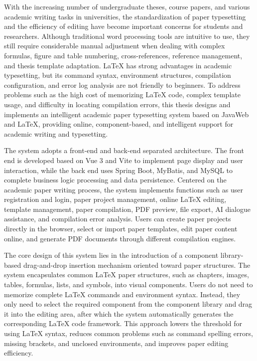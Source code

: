 With the increasing number of undergraduate theses, course papers, and various academic writing tasks in universities, the standardization of paper typesetting and the efficiency of editing have become important concerns for students and researchers. Although traditional word processing tools are intuitive to use, they still require considerable manual adjustment when dealing with complex formulas, figure and table numbering, cross-references, reference management, and thesis template adaptation. LaTeX has strong advantages in academic typesetting, but its command syntax, environment structures, compilation configuration, and error log analysis are not friendly to beginners. To address problems such as the high cost of memorizing LaTeX code, complex template usage, and difficulty in locating compilation errors, this thesis designs and implements an intelligent academic paper typesetting system based on JavaWeb and LaTeX, providing online, component-based, and intelligent support for academic writing and typesetting.

The system adopts a front-end and back-end separated architecture. The front end is developed based on Vue 3 and Vite to implement page display and user interaction, while the back end uses Spring Boot, MyBatis, and MySQL to complete business logic processing and data persistence. Centered on the academic paper writing process, the system implements functions such as user registration and login, paper project management, online LaTeX editing, template management, paper compilation, PDF preview, file export, AI dialogue assistance, and compilation error analysis. Users can create paper projects directly in the browser, select or import paper templates, edit paper content online, and generate PDF documents through different compilation engines.

The core design of this system lies in the introduction of a component library-based drag-and-drop insertion mechanism oriented toward paper structures. The system encapsulates common LaTeX paper structures, such as chapters, images, tables, formulas, lists, and symbols, into visual components. Users do not need to memorize complete LaTeX commands and environment syntax. Instead, they only need to select the required component from the component library and drag it into the editing area, after which the system automatically generates the corresponding LaTeX code framework. This approach lowers the threshold for using LaTeX syntax, reduces common problems such as command spelling errors, missing brackets, and unclosed environments, and improves paper editing efficiency.

